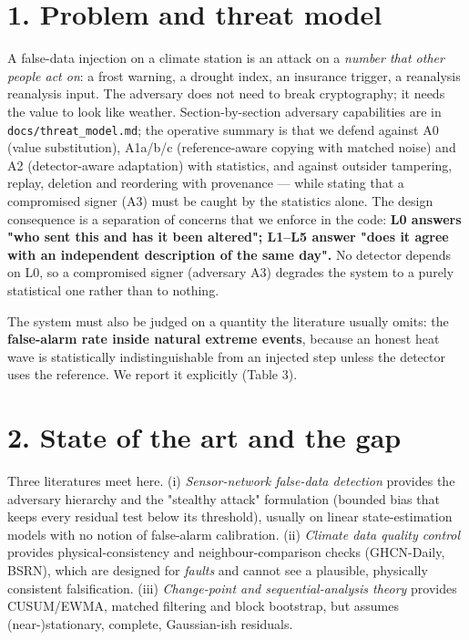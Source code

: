 \documentclass[10pt,a4paper]{article}
\begin{document}
\section*{1. Problem and threat model}
A false-\allowbreak{}data injection on a climate station is an attack on a \emph{number that other people act on}: a frost warning, a drought index, an insurance trigger, a reanalysis reanalysis input. The adversary does not need to break cryptography; it needs the value to look like weather. Section-\allowbreak{}by-\allowbreak{}section adversary capabilities are in \texttt{docs/\allowbreak{}threat\_\allowbreak{}model.md}; the operative summary is that we defend against A0 (value substitution), A1a/\allowbreak{}b/\allowbreak{}c (reference-\allowbreak{}aware copying with matched noise) and A2 (detector-\allowbreak{}aware adaptation) with statistics, and against outsider tampering, replay, deletion and reordering with provenance — while stating that a compromised signer (A3) must be caught by the statistics alone. The design consequence is a separation of concerns that we enforce in the code: \textbf{L0 answers "who sent this and has it been altered"; L1–L5 answer "does it agree with an independent description of the same day".} No detector depends on L0, so a compromised signer (adversary A3) degrades the system to a purely statistical one rather than to nothing.

The system must also be judged on a quantity the literature usually omits: the \textbf{false-\allowbreak{}alarm rate inside natural extreme events}, because an honest heat wave is statistically indistinguishable from an injected step unless the detector uses the reference. We report it explicitly (Table 3).

\section*{2. State of the art and the gap}
Three literatures meet here. (i) \emph{Sensor-\allowbreak{}network false-\allowbreak{}data detection} provides the adversary hierarchy and the "stealthy attack" formulation (bounded bias that keeps every residual test below its threshold), usually on linear state-\allowbreak{}estimation models with no notion of false-\allowbreak{}alarm calibration. (ii) \emph{Climate data quality control} provides physical-\allowbreak{}consistency and neighbour-\allowbreak{}comparison checks (GHCN-\allowbreak{}Daily, BSRN), which are designed for \emph{faults} and cannot see a plausible, physically consistent falsification. (iii) \emph{Change-\allowbreak{}point and sequential-\allowbreak{}analysis theory} provides CUSUM/\allowbreak{}EWMA, matched filtering and block bootstrap, but assumes (near-\allowbreak{})stationary, complete, Gaussian-\allowbreak{}ish residuals.
\end{document}
